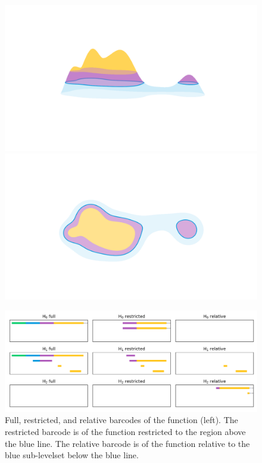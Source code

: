 \begin{figure}[htbp]
  \centering
  \begin{minipage}[b]{0.27\textwidth}
    \includegraphics[trim=200 200 200 100, clip, width=\textwidth]{scripts/figures/surf/ass2_C_side.png}\\
    \includegraphics[trim=200 100 200 200, clip, width=\textwidth]{scripts/figures/surf/ass2_C_top.png}
  \end{minipage}
  \begin{minipage}[b]{0.7\textwidth}
    \includegraphics[width=\textwidth]{scripts/figures/barcodes/res_rel.png}
  \end{minipage}
  \caption{Full, restricted, and relative barcodes of the function (left).%
    The restricted barcode is of the function restricted to the region above the blue line.
    The relative barcode is of the function relative to the blue sub-levelset below the blue line.}

\end{figure}
